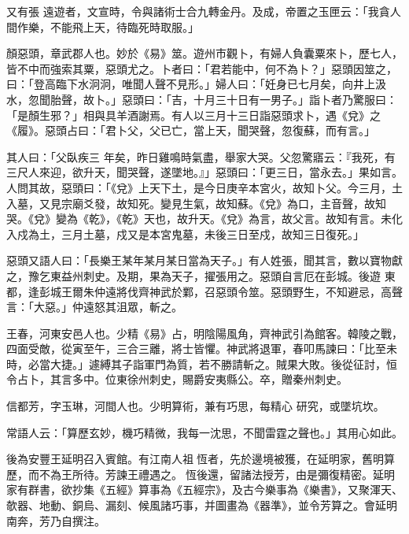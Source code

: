 \begin{pinyinscope}
 又有張
 遠遊者，文宣時，令與諸術士合九轉金丹。及成，帝置之玉匣云：「我貪人間作樂，不能飛上天，待臨死時取服。」



 顏惡頭，章武郡人也。妙於《易》筮。遊州市觀卜，有婦人負囊粟來卜，歷七人，皆不中而強索其粟，惡頭尤之。卜者曰：「君若能中，何不為卜？」惡頭因筮之，曰：「登高臨下水泂泂，唯聞人聲不見形。」婦人曰：「妊身已七月矣，向井上汲水，忽聞胎聲，故卜。」惡頭曰：「吉，十月三十日有一男子。」詣卜者乃驚服曰：「是顏生邪？」相與具羊酒謝焉。有人以三月十三日詣惡頭求卜，遇《兌》之《履》。惡頭占曰：「君卜父，父已亡，當上天，聞哭聲，忽復蘇，而有言。」



 其人曰：「父臥疾三
 年矣，昨日雞鳴時氣盡，舉家大哭。父忽驚寤云：『我死，有三尺人來迎，欲升天，聞哭聲，遂墜地。』」惡頭曰：「更三日，當永去。」果如言。人問其故，惡頭曰：「《兌》上天下土，是今日庚辛本宮火，故知卜父。今三月，土入墓，又見宗廟爻發，故知死。變見生氣，故知蘇。《兌》為口，主音聲，故知哭。《兌》變為《乾》，《乾》天也，故升天。《兌》為言，故父言。故知有言。未化入戍為土，三月土墓，戍又是本宮鬼墓，未後三日至戍，故知三日復死。」



 惡頭又語人曰：「長樂王某年某月某日當為天子。」有人姓張，聞其言，數以寶物獻之，豫乞東益州刺史。及期，果為天子，擢張用之。惡頭自言厄在彭城。後遊
 東都，逢彭城王爾朱仲遠將伐齊神武於鄴，召惡頭令筮。惡頭野生，不知避忌，高聲言：「大惡。」仲遠怒其沮眾，斬之。



 王春，河東安邑人也。少精《易》占，明陰陽風角，齊神武引為館客。韓陵之戰，四面受敵，從寅至午，三合三離，將士皆懼。神武將退軍，春叩馬諫曰：「比至未時，必當大捷。」遽縛其子詣軍門為質，若不勝請斬之。賊果大敗。後從征討，恒令占卜，其言多中。位東徐州刺史，賜爵安夷縣公。卒，贈秦州刺史。



 信都芳，字玉琳，河間人也。少明算術，兼有巧思，每精心
 研究，或墜坑坎。



 常語人云：「算歷玄妙，機巧精微，我每一沈思，不聞雷霆之聲也。」其用心如此。



 後為安豐王延明召入賓館。有江南人祖恆者，先於邊境被獲，在延明家，舊明算歷，而不為王所待。芳諫王禮遇之。恆後還，留諸法授芳，由是彌復精密。延明家有群書，欲抄集《五經》算事為《五經宗》，及古今樂事為《樂書》，又聚渾天、欹器、地動、銅烏、漏刻、候風諸巧事，并圖畫為《器準》，並令芳算之。會延明南奔，芳乃自撰注。




\end{pinyinscope}
